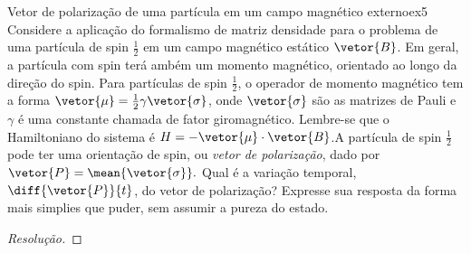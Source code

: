 \begin{exercício}{Vetor de polarização de uma partícula em um campo magnético externo}{ex5}
   Considere a aplicação do formalismo de matriz densidade para o problema de uma partícula de spin \(\frac12\) em um campo magnético estático \(\vetor{B}\). Em geral, a partícula com spin terá ambém um momento magnético, orientado ao longo da direção do spin. Para partículas de spin \(\frac12\), o operador de momento magnético tem a forma \(\vetor{\mu} = \frac12 \gamma \vetor{\sigma}\), onde \(\vetor{\sigma}\) são as matrizes de Pauli e \(\gamma\) é uma constante chamada de fator giromagnético. Lembre-se que o Hamiltoniano do sistema é \(H = -\vetor{\mu}\cdot \vetor{B}\).A partícula de spin \(\frac12\) pode ter uma orientação de spin, ou \emph{vetor de polarização}, dado por \(\vetor{P} = \mean{\vetor{\sigma}}.\) Qual é a variação temporal, \(\diff{\vetor{P}}{t}\), do vetor de polarização? Expresse sua resposta da forma mais simplies que puder, sem assumir a pureza do estado.
\end{exercício}
\begin{proof}[Resolução]
    
\end{proof}
